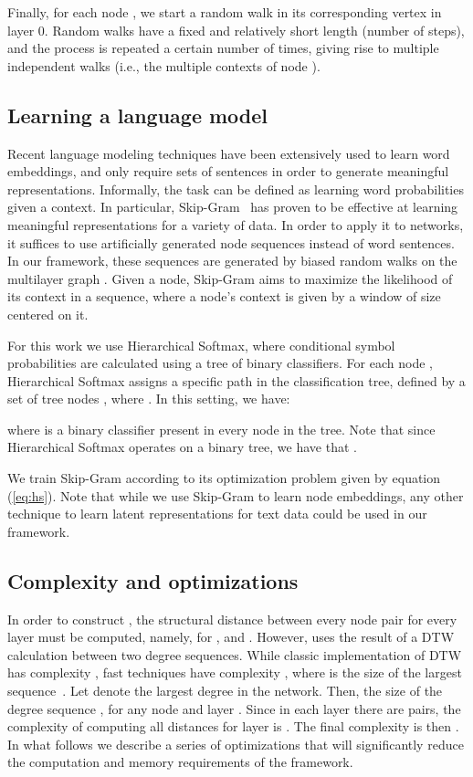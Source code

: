 \documentclass[sigconf]{acmart}
\begin{document}
Finally, for each node , we start a random walk in its corresponding vertex in layer 0. Random walks have a fixed and relatively short length (number of steps), and the process is repeated a certain number of times, giving rise to multiple independent walks (i.e., the multiple contexts of node ). 

\subsection{Learning a language model} \label{skip-gram}

Recent language modeling techniques have been extensively used to learn word embeddings, and only require sets of sentences in order to generate meaningful representations. Informally, the task can be defined as learning word probabilities given a context.
In particular, Skip-Gram~\cite{skipgram-mikolov} has proven to be effective at learning meaningful representations for a variety of data. In order to apply it to networks, it suffices to use artificially generated node sequences instead of word sentences. In our framework, these sequences are generated by biased random walks on the multilayer graph . 
Given a node, Skip-Gram aims to maximize the likelihood of its context in a sequence, where a node's context is given by a window of size  centered on it. 



For this work we use Hierarchical Softmax, where conditional symbol probabilities are calculated using a tree of binary classifiers. For each node , Hierarchical Softmax assigns a specific path in the classification tree, defined by a set of tree nodes , where . In this setting, we have:

where  is a binary classifier present in every node in the tree. Note that since Hierarchical Softmax operates on a binary tree, we have that .

We train Skip-Gram according to its optimization problem given by equation (\ref{eq:hs}). Note that while we use Skip-Gram to learn node embeddings, any other technique to learn latent representations for text data could be used in our framework. 

\subsection{Complexity and optimizations}
\label{sec:complexity}

In order to construct , the structural distance between every node pair for every layer must be computed, namely,  for , and . However,  uses the result of a DTW calculation between two degree sequences. While classic implementation of DTW has complexity , fast techniques have complexity , where  is the size of the largest sequence~\cite{salvador2004fastdtw}. Let  denote the largest degree in the network. Then, the size of the degree sequence , for any node  and layer . Since in each layer there are  pairs, the complexity of computing all distances for layer  is . The final complexity is then . In what follows we describe a series of optimizations that will significantly reduce the computation and memory requirements of the framework.
\end{document}
